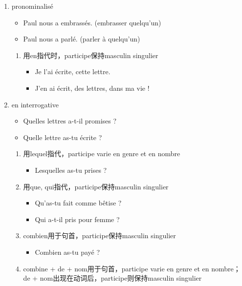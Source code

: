 \documentclass[UTF8]{report}
\begin{document}
\begin{enumerate}
    \item pronominalisé
    \begin{itemize}
        \item Paul nous a embrassés. (embrasser quelqu’un)
        \item Paul nous a parlé. (parler à quelqu’un)
    \end{itemize}
    \begin{enumerate}
        \item 用en指代时，participe保持masculin singulier
        \begin{itemize}
            \item Je l’ai écrite, cette lettre.
            \item J’en ai écrit, des lettres, dans ma vie !
        \end{itemize}
    \end{enumerate}
    \item en interrogative
    \begin{itemize}
        \item Quelles lettres a-t-il promises ?
        \item Quelle lettre as-tu écrite ?
    \end{itemize}
    \begin{enumerate}
        \item 用lequel指代，participe varie en genre et en nombre
        \begin{itemize}
            \item Lesquelles as-tu prises ?
        \end{itemize}
        \item 用que, qui指代，participe保持masculin singulier
        \begin{itemize}
            \item Qu’as-tu fait comme bêtise ?
            \item Qui a-t-il pris pour femme ?
        \end{itemize}
        \item combien用于句首，participe保持masculin singulier
        \begin{itemize}
            \item Combien as-tu payé ?
        \end{itemize}
        \item combine + de + nom用于句首，participe varie en genre et en nombre；de + nom出现在动词后，participe则保持masculin singulier
        \begin{itemize}

\end{itemize}
\end{enumerate}
\end{enumerate}
\end{document}
